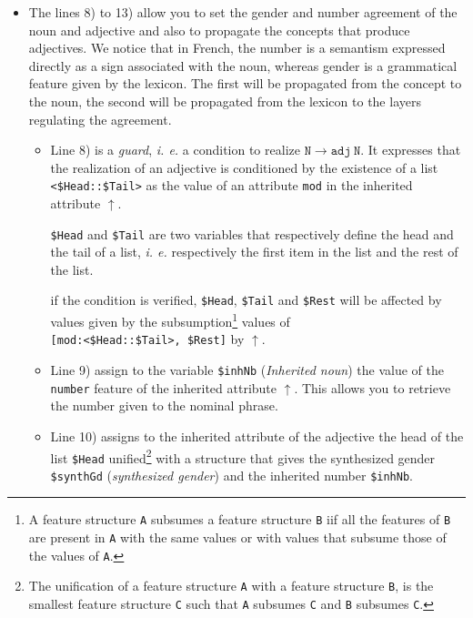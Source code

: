 \documentclass[11pt]{article}
\begin{document}
\begin{itemize}
	\item The lines 8) to 13) allow you to set the gender and
	      number agreement of the noun and adjective and also to propagate the
	      concepts that produce adjectives. We notice that in French, the
	      number is a semantism expressed directly as a sign associated with
	      the noun, whereas gender is a grammatical feature given by the
	      lexicon. The first will be propagated from the concept to the noun,
	      the second will be propagated from the lexicon to the layers
	      regulating the agreement.


	      \begin{itemize}
		      \item Line 8) is a \textit{guard}, \textit{i. e.} a
		            condition to realize
		            $\mathtt{N} \rightarrow \mathtt{adj}~ \mathtt{N}$. It expresses that the
		            realization of an adjective is conditioned by
		            the existence of a list
		            \verb#<$Head::$Tail># as the value of an attribute \texttt{mod}
		            in the inherited attribute $\uparrow$.

		            \verb#$Head# and
		            \verb#$Tail# are two variables that respectively define the
		            head and the tail of a list, \textit{i. e.} respectively the
		            first item in the list and the rest of the list.

		            if the condition is verified,
		            \verb#$Head#, \verb#$Tail# and
		            \verb#$Rest# will be affected by values given by the
		            subsumption\footnote{A feature structure \texttt{A} subsumes
			            a feature structure \texttt{B} iif all the features of
			            \texttt{B} are present in \texttt{A} with the same values
			            or with values that subsume those of the
			            values of \texttt{A}. } values of \\\verb#[mod:<$Head::$Tail>, $Rest]#
		            by $\uparrow$.

		      \item Line 9) assign to the variable
		            \verb#$inhNb# (\textit{Inherited noun}) the value of the
		            \texttt{number} feature of the inherited attribute
		            $\uparrow$. This allows you to retrieve the number given to the
		            nominal phrase.

		      \item Line 10) assigns to the inherited attribute of the adjective
		            the head of the list \verb#$Head# unified\footnote{The unification
			            of a feature structure \texttt{A} with a feature structure
			            \texttt{B}, is the smallest feature structure \texttt{C} such
			            that \texttt{A} subsumes \texttt{C} and \texttt{B} subsumes
			            \texttt{C}.} with a structure that gives the synthesized gender
		            \verb#$synthGd# (\textit{synthesized gender}) and the inherited
		            number \verb#$inhNb#.


\end{itemize}
\end{itemize}
\end{document}
